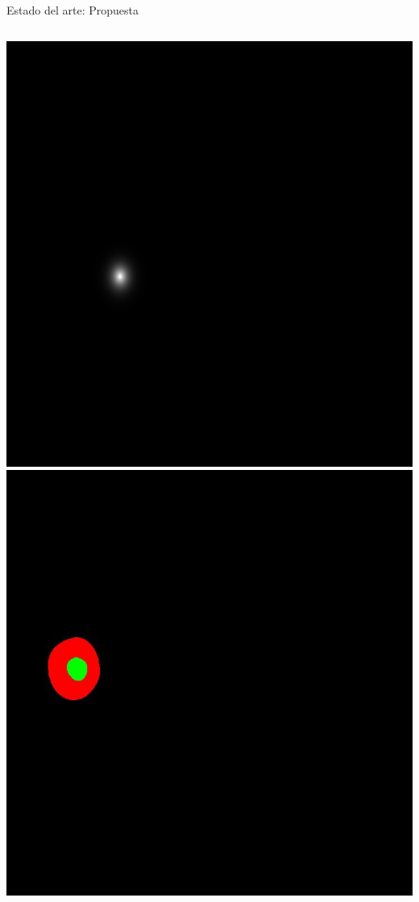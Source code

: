 \documentclass[xcolor=dvipsnames,table]{beamer}
\begin{document}
\begin{frame}{Estado del arte: Propuesta}
\begin{columns}[c]
\begin{columns}[c]
\begin{center}
				\hspace*{-0.2cm}
				\includegraphics[width=0.5\linewidth]{my_images/ML/fovea_10.jpg}\\[0.2cm]
				\hspace*{-0.2cm}
				\includegraphics[width=0.5\linewidth]{my_images/ML/hard.jpg}
			\end{center}
		\end{columns}
		\vfill
	\end{columns}
\end{frame}
\end{document}
